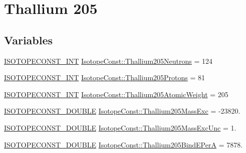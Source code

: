 \hypertarget{group___isotope_const-_thallium-_tl205}{}\section{Thallium 205}
\label{group___isotope_const-_thallium-_tl205}
\subsection*{Variables}
\begin{DoxyCompactItemize}
\item 
\mbox{\hyperlink{group___isotope_const-_macros_ga5f18360b3e99483a35c32d789e62621c}{I\+S\+O\+T\+O\+P\+E\+C\+O\+N\+S\+T\+\_\+\+I\+NT}} \mbox{\hyperlink{group___isotope_const-_thallium-_tl205_ga104f9e4e78aa547a9fba8f290c69d0fe}{Isotope\+Const\+::\+Thallium205\+Neutrons}} = 124
\item 
\mbox{\hyperlink{group___isotope_const-_macros_ga5f18360b3e99483a35c32d789e62621c}{I\+S\+O\+T\+O\+P\+E\+C\+O\+N\+S\+T\+\_\+\+I\+NT}} \mbox{\hyperlink{group___isotope_const-_thallium-_tl205_gad45f8a90493c7c2ed9a5da78013fe63d}{Isotope\+Const\+::\+Thallium205\+Protons}} = 81
\item 
\mbox{\hyperlink{group___isotope_const-_macros_ga5f18360b3e99483a35c32d789e62621c}{I\+S\+O\+T\+O\+P\+E\+C\+O\+N\+S\+T\+\_\+\+I\+NT}} \mbox{\hyperlink{group___isotope_const-_thallium-_tl205_gaff4c365318686bdaf785d161beba07cf}{Isotope\+Const\+::\+Thallium205\+Atomic\+Weight}} = 205
\item 
\mbox{\hyperlink{group___isotope_const-_macros_ga8f45a7272ce02c0b4c65c44636ed719a}{I\+S\+O\+T\+O\+P\+E\+C\+O\+N\+S\+T\+\_\+\+D\+O\+U\+B\+LE}} \mbox{\hyperlink{group___isotope_const-_thallium-_tl205_ga476dc8b89e81c5d144f7c2bbdfde927f}{Isotope\+Const\+::\+Thallium205\+Mass\+Exc}} = -\/23820.
\item 
\mbox{\hyperlink{group___isotope_const-_macros_ga8f45a7272ce02c0b4c65c44636ed719a}{I\+S\+O\+T\+O\+P\+E\+C\+O\+N\+S\+T\+\_\+\+D\+O\+U\+B\+LE}} \mbox{\hyperlink{group___isotope_const-_thallium-_tl205_ga9a9efd1eebb984ebf9b1115cd96be78a}{Isotope\+Const\+::\+Thallium205\+Mass\+Exc\+Unc}} = 1.
\item 
\mbox{\hyperlink{group___isotope_const-_macros_ga8f45a7272ce02c0b4c65c44636ed719a}{I\+S\+O\+T\+O\+P\+E\+C\+O\+N\+S\+T\+\_\+\+D\+O\+U\+B\+LE}} \mbox{\hyperlink{group___isotope_const-_thallium-_tl205_gae8a7bc37033ff885630da55c4b495736}{Isotope\+Const\+::\+Thallium205\+Bind\+E\+PerA}} = 7878.
\item 

\end{DoxyCompactItemize}
